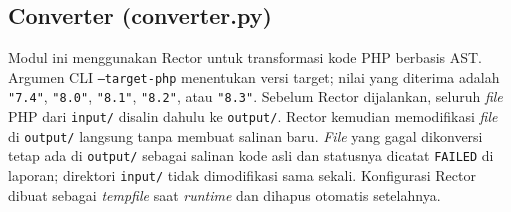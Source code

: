 \subsection{Converter (converter.py)}

\begin{sloppypar}

Modul ini menggunakan Rector untuk transformasi kode PHP berbasis AST. Argumen CLI \texttt{--target-php} menentukan versi target; nilai yang diterima adalah \texttt{"7.4"}, \texttt{"8.0"}, \texttt{"8.1"}, \texttt{"8.2"}, atau \texttt{"8.3"}. Sebelum Rector dijalankan, seluruh \textit{file} PHP dari \texttt{input/} disalin dahulu ke \texttt{output/}. Rector kemudian memodifikasi \textit{file} di \texttt{output/} langsung tanpa membuat salinan baru. \textit{File} yang gagal dikonversi tetap ada di \texttt{output/} sebagai salinan kode asli dan statusnya dicatat \texttt{FAILED} di laporan; direktori \texttt{input/} tidak dimodifikasi sama sekali. Konfigurasi Rector dibuat sebagai \textit{tempfile} saat \textit{runtime} dan dihapus otomatis setelahnya.

\end{sloppypar}

